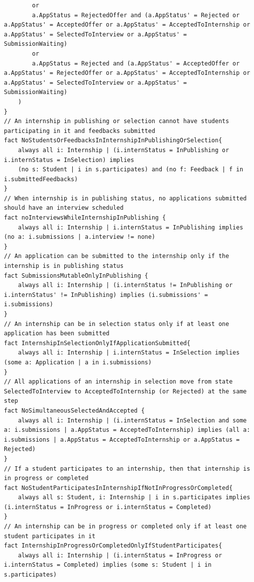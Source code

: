 \begin{lstlisting}
        or
        a.AppStatus = RejectedOffer and (a.AppStatus' = Rejected or a.AppStatus' = AcceptedOffer or a.AppStatus' = AcceptedToInternship or a.AppStatus' = SelectedToInterview or a.AppStatus' = SubmissionWaiting)
        or
        a.AppStatus = Rejected and (a.AppStatus' = AcceptedOffer or a.AppStatus' = RejectedOffer or a.AppStatus' = AcceptedToInternship or a.AppStatus' = SelectedToInterview or a.AppStatus' = SubmissionWaiting)
    )
}
// An internship in publishing or selection cannot have students participating in it and feedbacks submitted
fact NoStudentsOrFeedbacksInInternshipInPublishingOrSelection{
    always all i: Internship | (i.internStatus = InPublishing or i.internStatus = InSelection) implies
    (no s: Student | i in s.participates) and (no f: Feedback | f in i.submittedFeedbacks)
}
// When internship is in publishing status, no applications submitted should have an interview scheduled
fact noInterviewsWhileInternshipInPublishing {
    always all i: Internship | i.internStatus = InPublishing implies (no a: i.submissions | a.interview != none)
}
// An application can be submitted to the internship only if the internship is in publishing status
fact SubmissionsMutableOnlyInPublishing {
    always all i: Internship | (i.internStatus != InPublishing or i.internStatus' != InPublishing) implies (i.submissions' = i.submissions)
}
// An internship can be in selection status only if at least one application has been submitted
fact InternshipInSelectionOnlyIfApplicationSubmitted{
    always all i: Internship | i.internStatus = InSelection implies (some a: Application | a in i.submissions)
}
// All applications of an internship in selection move from state SelectedToInterview to AcceptedToInternship (or Rejected) at the same step
fact NoSimultaneousSelectedAndAccepted {
    always all i: Internship | (i.internStatus = InSelection and some a: i.submissions | a.AppStatus = AcceptedToInternship) implies (all a: i.submissions | a.AppStatus = AcceptedToInternship or a.AppStatus = Rejected)
}
// If a student participates to an internship, then that internship is in progress or completed
fact NoStudentParticipatesInInternshipIfNotInProgressOrCompleted{
    always all s: Student, i: Internship | i in s.participates implies (i.internStatus = InProgress or i.internStatus = Completed)
}
// An internship can be in progress or completed only if at least one student participates in it
fact InternshipInProgressOrCompletedOnlyIfStudentParticipates{
    always all i: Internship | (i.internStatus = InProgress or i.internStatus = Completed) implies (some s: Student | i in s.participates)

\end{lstlisting}
